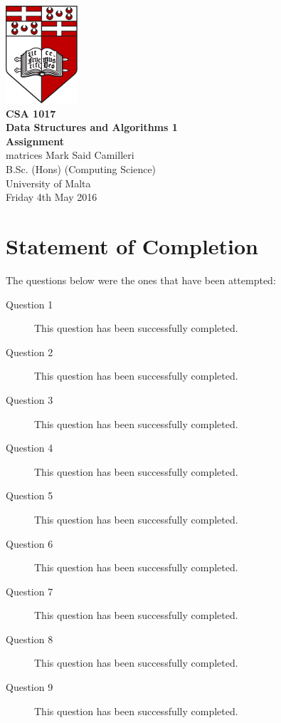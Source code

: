 \documentclass[12pt,a4paper,onesided]{report}
\begin{document}
	\begin{titlepage}
		\vspace*{\fill}
\centering
\includegraphics[width=0.2\textwidth]{University_of_Malta_Logo}\\
\vspace*{3em}
\textbf{\LARGE CSA 1017\\\vspace{0.1em}Data Structures and Algorithms 1}\\
\vspace*{0.75em}
\textbf{\Large Assignment}\\
\vspace{3em}matrices
\large Mark Said Camilleri\\
B.Sc. (Hons) (Computing Science)\\
University of Malta\\
\vspace*{1em}
Friday 4th May 2016
\vfill
\end{titlepage}
\pagebreak
\tableofcontents
{}

\chapter*{Statement of Completion}
The questions below were the ones that have been attempted:
	\begin{description}
		\item[Question 1]This question has been successfully completed.
		\item[Question 2]This question has been successfully completed.
		\item[Question 3]This question has been successfully completed.
		\item[Question 4]This question has been successfully completed.
		\item[Question 5]This question has been successfully completed.
		\item[Question 6]This question has been successfully completed.
		\item[Question 7]This question has been successfully completed.
		\item[Question 8]This question has been successfully completed.
		\item[Question 9]This question has been successfully completed.
	\end{description}
\end{document}
